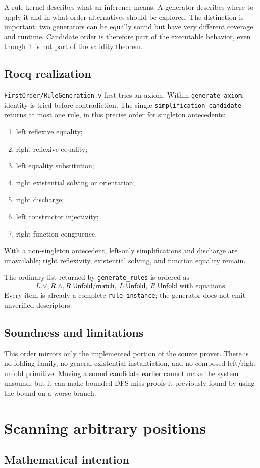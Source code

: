 \documentclass[11pt,oneside]{book}
\DeclareRobustCommand{\code}[1]{\nolinkurl{#1}}
\DeclareRobustCommand{\file}[1]{\nolinkurl{#1}}
\newcommand{\mathintent}{\subsection*{Mathematical intention}}
\newcommand{\rocqreal}{\subsection*{Rocq realization}}
\newcommand{\soundlim}{\subsection*{Soundness and limitations}}
\begin{document}
A rule kernel describes what an inference means.  A generator describes where
to apply it and in what order alternatives should be explored.  The distinction
is important: two generators can be equally sound but have very different
coverage and runtime.  Candidate order is therefore part of the executable
behavior, even though it is not part of the validity theorem.

\rocqreal

\file{FirstOrder/RuleGeneration.v} first tries an axiom.  Within
\code{generate_axiom}, identity is tried before contradiction.  The single
\code{simplification_candidate} returns at most one rule, in this precise
order for singleton antecedents:
\begin{enumerate}[leftmargin=*]
\item left reflexive equality;
\item right reflexive equality;
\item left equality substitution;
\item right existential solving or orientation;
\item right discharge;
\item left constructor injectivity;
\item right function congruence.
\end{enumerate}
With a non-singleton antecedent, left-only simplifications and discharge are
unavailable; right reflexivity, existential solving, and function equality
remain.

The ordinary list returned by \code{generate_rules} is ordered as
\[
 L.\lor, R.\land, R.\mathsf{Unfold}/\mathsf{match},\
 L.\mathsf{Unfold},\ R.\mathsf{Unfold}\text{ with equations}.
\]
Every item is already a complete \code{rule_instance}; the generator does not
emit unverified descriptors.

\soundlim

This order mirrors only the implemented portion of the source prover.  There
is no folding family, no general existential instantiation, and no composed
left/right unfold primitive.  Moving a sound candidate earlier cannot make the
system unsound, but it can make bounded DFS miss proofs it previously found by
using the bound on a worse branch.

\section{Scanning arbitrary positions}

\mathintent
\end{document}
